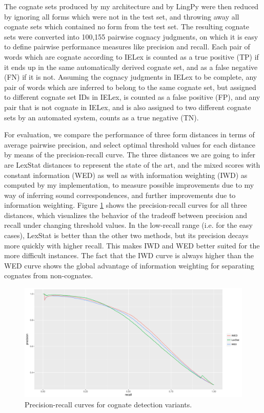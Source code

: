 The cognate sets produced by my architecture and by LingPy were then reduced by ignoring all forms which were not in the test set, and throwing away all cognate sets which contained no form from the test set. The resulting cognate sets were converted into 100,155 pairwise cognacy judgments, on which it is easy to define pairwise performance measures like precision and recall. Each pair of words which are cognate according to IELex is counted as a true positive (TP) if it ends up in the same automatically derived cognate set, and as a false negative (FN) if it is not. Assuming the cognacy judgments in IELex to be complete, any pair of words which are inferred to belong to the same cognate set, but assigned to different cognate set IDs in IELex, is counted as a false positive (FP), and any pair that is not cognate in IELex, and is also assigned to two different cognate sets by an automated system, counts as a true negative (TN).

For evaluation, we compare the performance of three form distances in terms of average pairwise precision, and select optimal threshold values for each distance by means of the precision-recall curve. The three distances we are going to infer are LexStat distances to represent the state of the art, and the mixed scores with constant information (WED) as well as with information weighting (IWD) as computed by my implementation, to measure possible improvements due to my way of inferring sound correspondences, and further improvements due to information weighting. Figure \ref{precision-recall-curves} shows the precision-recall curves for all three distances, which visualizes the behavior of the tradeoff between precision and recall under changing threshold values. In the low-recall range (i.e. for the easy cases), LexStat is better than the other two methods, but its precision decays more quickly with higher recall. This makes IWD and WED better suited for the more difficult instances. The fact that the IWD curve is always higher than the WED curve shows the global advantage of information weighting for separating cognates from non-cognates.

\begin{figure}[ht]
 \includegraphics[width=\textwidth]{figures/precision-recall-curves.pdf}
 \caption{Precision-recall curves for cognate detection variants.}
 \label{precision-recall-curves}
\end{figure}

